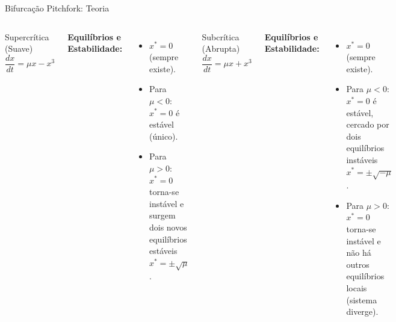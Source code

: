 \begin{frame}{Bifurcação Pitchfork: Teoria}
\begin{columns}
\begin{block}{Supercrítica (Suave)}
\begin{equation*}
\frac{dx}{dt} = \mu x - x^3
\end{equation*}
\end{block}

\textbf{Equilíbrios e Estabilidade:}
\begin{itemize}
    \item $x^* = 0$ (sempre existe).
    \item Para $\mu < 0$: $x^* = 0$ é estável (único).
    \item Para $\mu > 0$: $x^* = 0$ torna-se instável e surgem dois novos equilíbrios estáveis $x^* = \pm\sqrt{\mu}$.
\end{itemize}

\begin{block}{Subcrítica (Abrupta)}
\begin{equation*}
\frac{dx}{dt} = \mu x + x^3
\end{equation*}
\end{block}

\textbf{Equilíbrios e Estabilidade:}
\begin{itemize}
    \item $x^* = 0$ (sempre existe).
    \item Para $\mu < 0$: $x^* = 0$ é estável, cercado por dois equilíbrios instáveis $x^* = \pm\sqrt{-\mu}$.
    \item Para $\mu > 0$: $x^* = 0$ torna-se instável e não há outros equilíbrios locais (sistema diverge).
\end{itemize}
\end{columns}
\end{frame}

